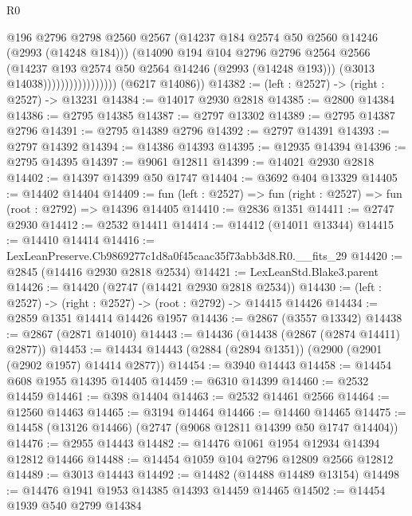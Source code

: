 \begin{lexlean}{R0}
\begin{coremodule}
                                    @196
                                    @2796
                                    @2798
                                    @2560
                                    @2567
                                    (@14237 @184 @2574 @50 @2560 @14246 (@2993 (@14248 @184)))
                                    (@14090
                                      @194
                                      @104
                                      @2796
                                      @2796
                                      @2564
                                      @2566
                                      (@14237 @193 @2574 @50 @2564 @14246 (@2993 (@14248 @193)))
                                      (@3013 @14038)))))))))))))))))
      (@6217 @14086))
@14382 := (left : @2527) -> (right : @2527) -> @13231
@14384 := @14017 @2930 @2818
@14385 := @2800 @14384
@14386 := @2795 @14385
@14387 := @2797 @13302
@14389 := @2795 @14387 @2796
@14391 := @2795 @14389 @2796
@14392 := @2797 @14391
@14393 := @2797 @14392
@14394 := @14386 @14393
@14395 := @12935 @14394
@14396 := @2795 @14395
@14397 := @9061 @12811
@14399 := @14021 @2930 @2818
@14402 := @14397 @14399 @50 @1747
@14404 := @3692 @404 @13329
@14405 := @14402 @14404
@14409 := fun (left : @2527) => fun (right : @2527) => fun (root : @2792) => @14396 @14405
@14410 := @2836 @1351
@14411 := @2747 @2930
@14412 := @2532 @14411
@14414 := @14412 (@14011 @13344)
@14415 := @14410 @14414
@14416 := LexLeanPreserve.Cb9869277c1d8a0f45caac35f73abb3d8.R0.__fits_29
@14420 := @2845 (@14416 @2930 @2818 @2534)
@14421 := LexLeanStd.Blake3.parent
@14426 := @14420 (@2747 (@14421 @2930 @2818 @2534))
@14430 := (left : @2527) -> (right : @2527) -> (root : @2792) -> @14415 @14426
@14434 := @2859 @1351 @14414 @14426 @1957
@14436 := @2867 (@3557 @13342)
@14438 := @2867 (@2871 @14010)
@14443 := @14436 (@14438 (@2867 (@2874 @14411) @2877))
@14453 := @14434 @14443 (@2884 (@2894 @1351)) (@2900 (@2901 (@2902 @1957) @14414 @2877))
@14454 := @3940 @14443
@14458 := @14454 @608 @1955 @14395 @14405
@14459 := @6310 @14399
@14460 := @2532 @14459
@14461 := @398 @14404
@14463 := @2532 @14461 @2566
@14464 := @12560 @14463
@14465 := @3194 @14464
@14466 := @14460 @14465
@14475 := @14458 (@13126 @14466) (@2747 (@9068 @12811 @14399 @50 @1747 @14404))
@14476 := @2955 @14443
@14482 := @14476 @1061 @1954 @12934 @14394 @12812 @14466
@14488 := @14454 @1059 @104 @2796 @12809 @2566 @12812
@14489 := @3013 @14443
@14492 := @14482 (@14488 @14489 @13154)
@14498 := @14476 @1941 @1953 @14385 @14393 @14459 @14465
@14502 := @14454 @1939 @540 @2799 @14384

\end{coremodule}
\end{lexlean}
